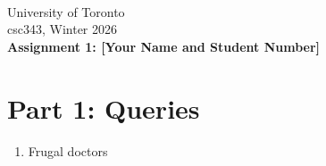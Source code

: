 \documentclass{article}
\begin{document}
~~~\vspace{-2.0cm}

\noindent
University of Toronto\\
{\sc csc}343, Winter 2026\\[10pt]
{\LARGE\bf Assignment 1: [Your Name and Student Number]}

\section*{Part 1: Queries}

\begin{enumerate}
\item   %
{Frugal doctors}


\end{enumerate}
\end{document}

